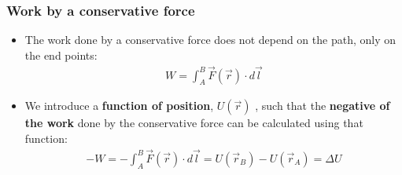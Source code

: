 \documentclass[aspectratio=169,
hyperref={colorlinks,urlcolor=blue}
]{beamer}
\begin{document}
\subsubsection{Work by a conservative force}
\label{subsubsec:workbyaconservativeforce}
{
\begin{itemize}
\item The work done by a conservative force does not depend on the path, only on the end points:
\begin{align*}
W=\int_A^B \vec F(\vec r) \cdot d\vec l
\end{align*}
\item We introduce a \textbf{function of position}, $U(\vec r)$ , such that the \textbf{negative of the work} done by the conservative force can be calculated using that function:
\begin{align*}
-W=-\int_A^B \vec F(\vec r) \cdot d\vec l=U(\vec r_B)-U(\vec r_A)=\Delta U
\end{align*}
\end{itemize}
}
\end{document}
